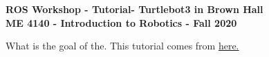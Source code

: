 \documentclass[12pt]{article}
\newcommand{\MNUM}{7} %
\newcommand{\MNAME}{Turtlebot3 in Brown Hall} %
\begin{document}
\thispagestyle{plain}

\begin{center}
   {\bf \Large ROS Workshop - Tutorial\hspc\MNUM\hspc - \MNAME}\vspace{3mm}\\
   {\bf \large ME 4140 - Introduction to Robotics - Fall 2020} \vspace{5mm}\\
\end{center}



What is the goal of the.  This tutorial comes from \href{http://emanual.robotis.com/docs/en/platform/turtlebot3/simulation/#simulation} {here.}  \\

\end{document}
